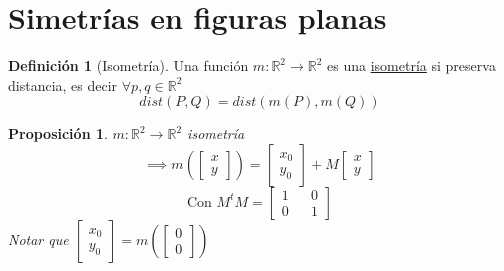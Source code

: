 \documentclass[11pt]{book}
\newtheorem{prop}[thm]{Proposición}
\theoremstyle{definition}
\newtheorem{defn}{Definición}[section]
\begin{document}
\section{Simetrías en figuras planas}
\begin{defn}[Isometría]
Una función $m:\mathbb{R}^2\rightarrow\mathbb{R}^2$ es una \underline{isometría} si preserva distancia, es decir $\forall p,q\in\mathbb{R}^2$
\[ dist(P,Q)=dist(m(P),m(Q))\]
\end{defn}
\begin{prop}
$m:\mathbb{R}^2\rightarrow\mathbb{R}^2$ isometría
\[\implies m\left(\begin{bmatrix} x\\ y\end{bmatrix}\right)=\begin{bmatrix} x_0\\y_0\end{bmatrix}+M \begin{bmatrix} x\\ y\end{bmatrix}\]
\[\textrm{Con }M^tM=\begin{bmatrix} 1 && 0\\ 0 && 1\end{bmatrix}\]
Notar que $\begin{bmatrix} x_0 \\ y_0\end{bmatrix}=m\left(\begin{bmatrix} 0 \\ 0\end{bmatrix}\right)$
\end{prop}
\end{document}
